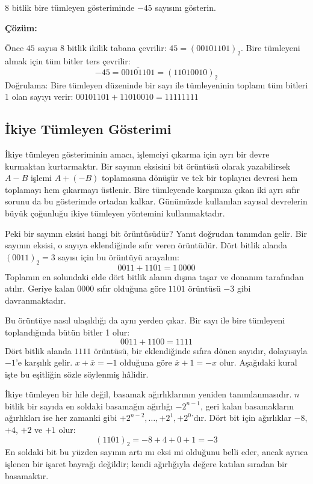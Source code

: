 \begin{ornek}[A.11]
8 bitlik bire tümleyen gösteriminde $-45$ sayısını gösterin.

\textbf{Çözüm:}

Önce $45$ sayısı 8 bitlik ikilik tabana çevrilir: $45 = (00101101)_2$. Bire tümleyeni almak için tüm bitler ters çevrilir:
\[
-45 = \overline{00101101} = (11010010)_2
\]
Doğrulama: Bire tümleyen düzeninde bir sayı ile tümleyeninin toplamı tüm bitleri 1 olan sayıyı verir: $00101101 + 11010010 = 11111111$ \checkmark
\end{ornek}

\subsection{İkiye Tümleyen Gösterimi}
\label{subsec:ikiye-tumleyen}

İkiye tümleyen gösteriminin amacı, işlemciyi çıkarma için ayrı bir devre kurmaktan kurtarmaktır. Bir sayının eksisini bit örüntüsü olarak yazabilirsek $A - B$ işlemi $A + (-B)$ toplamasına dönüşür ve tek bir toplayıcı devresi hem toplamayı hem çıkarmayı üstlenir. Bire tümleyende karşımıza çıkan iki ayrı sıfır sorunu da bu gösterimde ortadan kalkar. Günümüzde kullanılan sayısal devrelerin büyük çoğunluğu ikiye tümleyen yöntemini kullanmaktadır.

Peki bir sayının eksisi hangi bit örüntüsüdür? Yanıt doğrudan tanımdan gelir. Bir sayının eksisi, o sayıya eklendiğinde sıfır veren örüntüdür. Dört bitlik alanda $(0011)_2 = 3$ sayısı için bu örüntüyü arayalım:
\[
0011 + 1101 = 1\,0000
\]
Toplamın en solundaki elde dört bitlik alanın dışına taşar ve donanım tarafından atılır. Geriye kalan $0000$ sıfır olduğuna göre $1101$ örüntüsü $-3$ gibi davranmaktadır.

Bu örüntüye nasıl ulaşıldığı da aynı yerden çıkar. Bir sayı ile bire tümleyeni toplandığında bütün bitler 1 olur:
\[
0011 + 1100 = 1111
\]
Dört bitlik alanda $1111$ örüntüsü, bir eklendiğinde sıfıra dönen sayıdır, dolayısıyla $-1$'e karşılık gelir. $x + \overline{x} = -1$ olduğuna göre $\overline{x} + 1 = -x$ olur. Aşağıdaki kural işte bu eşitliğin sözle söylenmiş hâlidir.

İkiye tümleyen bir hile değil, basamak ağırlıklarının yeniden tanımlanmasıdır. $n$ bitlik bir sayıda en soldaki basamağın ağırlığı $-2^{n-1}$, geri kalan basamakların ağırlıkları ise her zamanki gibi $+2^{n-2}, \ldots, +2^1, +2^0$'dır. Dört bit için ağırlıklar $-8$, $+4$, $+2$ ve $+1$ olur:
\[
(1101)_2 = -8 + 4 + 0 + 1 = -3
\]
En soldaki bit bu yüzden sayının artı mı eksi mi olduğunu belli eder, ancak ayrıca işlenen bir işaret bayrağı değildir; kendi ağırlığıyla değere katılan sıradan bir basamaktır.

